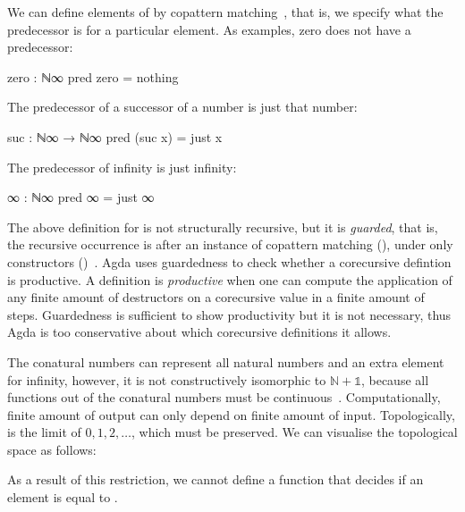 We can define elements of  by copattern
matching~\cite{abel-copatterns}, that is, we specify what the predecessor is for
a particular element. As examples, zero does not have a predecessor:
\begin{code}
zero : ℕ∞
pred zero = nothing
\end{code}
The predecessor of a successor of a number is just that number:
\begin{code}
suc : ℕ∞ → ℕ∞
pred (suc x) = just x
\end{code}
The predecessor of infinity is just infinity:
\begin{code}
∞ : ℕ∞
pred ∞ = just ∞
\end{code}
The above definition for  is not structurally recursive, but it
is \emph{guarded}, that is, the recursive occurrence is after an instance of
copattern matching (), under only constructors
()~\cite{coquand-infinite}. Agda uses guardedness
to check whether a corecursive defintion is productive. A definition is
\emph{productive} when one can compute the application of any finite amount of
destructors on a corecursive value in a finite amount of steps. Guardedness is
sufficient to show productivity but it is not necessary, thus Agda is too
conservative about which corecursive definitions it allows.

The conatural numbers can represent all natural numbers and an extra element for
infinity, however, it is not constructively isomorphic to $\mathbb{N} +
\mathbb{1}$, because all functions out of the conatural numbers must be
continuous~\cite{escardo-infinite}. Computationally, finite amount of output can
only depend on finite amount of input. Topologically,  is the
limit of $0, 1, 2, \dots$, which must be preserved. We can visualise the
topological space as follows:
\begin{center}
\end{center}
As a result of this restriction, we cannot define a function that decides if an
element is equal to .

